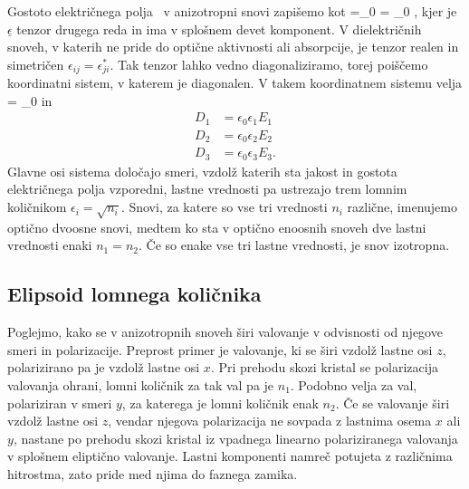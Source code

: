 Gostoto električnega polja~ v anizotropni snovi zapišemo kot 
\beq
{}=\epsilon_{0}\underline{\epsilon} \cdot{} = 
\epsilon_{0}
,
\label{eq:gostota-elektricnega-polja-tenzor}
\eeq
kjer je $\underline{\epsilon}$ tenzor drugega reda in ima v splošnem devet komponent.
V dielektričnih snoveh, v katerih ne pride do optične aktivnosti ali absorpcije, je tenzor
realen in simetričen $\epsilon_{ij}=\epsilon_{ji}^*$. Tak tenzor lahko vedno
diagonaliziramo, torej poiščemo koordinatni sistem, v katerem je 
diagonalen. V takem koordinatnem sistemu velja 
\beq
{} = \epsilon_{0}
\eeq
in 
\begin{align}
D_{1}&=\epsilon_{0}\epsilon_{1}E_{1}\nonumber \\
D_{2}&=\epsilon_{0}\epsilon_{2}E_{2}\nonumber \\
D_{3}&=\epsilon_{0}\epsilon_{3}E_{3}.\label{eq:gostota-elektricnega-polja-lastni}
\end{align}
Glavne osi sistema določajo smeri, vzdolž katerih sta jakost
in gostota električnega polja vzporedni, lastne vrednosti 
pa ustrezajo trem lomnim količnikom $\epsilon_{i}=\sqrt{n_{i}}$. Snovi,
za katere so vse tri vrednosti $n_i$ različne, imenujemo optično dvoosne snovi, 
medtem ko sta v optično enoosnih snoveh dve lastni vrednosti enaki $n_{1}=n_{2}$. 
Če so enake vse tri lastne vrednosti, je snov izotropna.

\subsection*{Elipsoid lomnega količnika}
Poglejmo, kako se v anizotropnih snoveh širi valovanje v odvisnosti
od njegove smeri in polarizacije. Preprost primer je valovanje, ki se širi vzdolž lastne
osi $z$, polarizirano pa je vzdolž lastne osi $x$. Pri prehodu
skozi kristal se polarizacija valovanja ohrani, lomni količnik za
tak val pa je $n_{1}$. Podobno velja za val, polariziran v smeri
$y$, za katerega je lomni količnik enak $n_{2}$. Če se valovanje širi vzdolž lastne
osi $z$, vendar njegova polarizacija ne sovpada z lastnima osema
$x$ ali $y$, nastane po prehodu skozi kristal iz vpadnega linearno polariziranega valovanja
v splošnem eliptično valovanje. Lastni komponenti namreč potujeta z različnima
hitrostma, zato pride med njima do faznega zamika.

